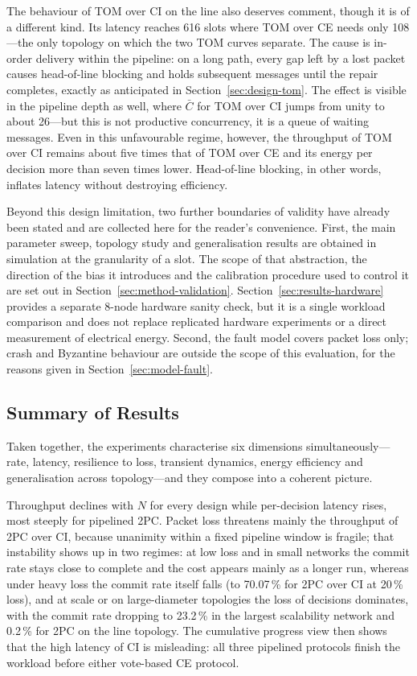 \documentclass[journal]{IEEEtran}
\newcommand{\CI}{CI}                      %
\newcommand{\CE}{CE}                      %
\newcommand{\Nnodes}{N}                   %
\newcommand{\Cdepth}{\bar{C}}             %
\begin{document}
The behaviour of TOM over \CI{} on the line also deserves comment, though
it is of a different kind. Its latency reaches 616 slots where TOM over
\CE{} needs only 108---the only topology on which the two TOM curves
separate. The cause is in-order delivery within the pipeline: on a long
path, every gap left by a lost packet causes head-of-line blocking and
holds subsequent messages until the repair completes, exactly as
anticipated in Section~\ref{sec:design-tom}. The effect is visible in the
pipeline depth as well, where $\Cdepth$ for TOM over \CI{} jumps from
unity to about 26---but this is not productive concurrency, it is a queue
of waiting messages. Even in this unfavourable regime, however, the
throughput of TOM over \CI{} remains about five times that of TOM over
\CE{} and its energy per decision more than seven times lower. Head-of-line
blocking, in other words, inflates latency without destroying efficiency.

Beyond this design limitation, two further boundaries of validity have
already been stated and are collected here for the reader's convenience.
First, the main parameter sweep, topology study and generalisation results
are obtained in simulation at the granularity of a slot. The scope of that
abstraction, the direction of the bias it introduces and the calibration
procedure used to control it are set out in
Section~\ref{sec:method-validation}. Section~\ref{sec:results-hardware}
provides a separate 8-node hardware sanity check, but it is a single
workload comparison and does not replace replicated hardware experiments or
a direct measurement of electrical energy. Second, the fault model covers packet
loss only; crash and Byzantine behaviour are outside the scope of this
evaluation, for the reasons given in Section~\ref{sec:model-fault}.

\subsection{Summary of Results}
\label{sec:results-summary}

Taken together, the experiments characterise six dimensions
simultaneously---rate, latency, resilience to loss, transient dynamics,
energy efficiency and generalisation across topology---and they compose
into a coherent picture.

Throughput declines with $\Nnodes$ for every design while per-decision
latency rises, most steeply for pipelined 2PC. Packet loss threatens
mainly the throughput of 2PC over \CI, because unanimity within a fixed
pipeline window is fragile; that instability shows up in two
regimes: at low loss and in small networks the commit rate stays close to
complete and the cost appears mainly as a longer run, whereas under heavy
loss the commit rate itself falls (to 70.07\,\% for 2PC over \CI{} at 20\,\%
loss), and at scale or on large-diameter topologies the loss of decisions
dominates, with the commit rate dropping to 23.2\,\% in the largest
scalability network and 0.2\,\% for 2PC on the line topology. The cumulative
progress view then shows that the high latency of \CI{} is misleading: all
three pipelined protocols finish the workload before either vote-based \CE{}
protocol.
\end{document}
